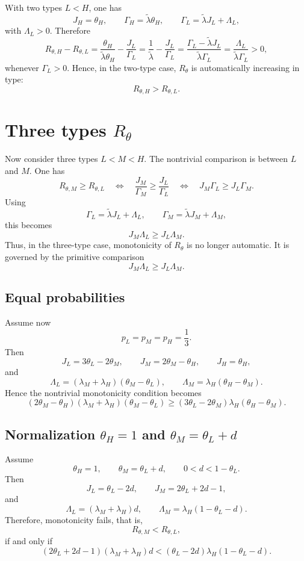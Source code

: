 \documentclass[11pt]{article}
\begin{document}
With two types $L<H$, one has
\[
J_H=\theta_H,
\qquad
\Gamma_H=\tilde\lambda\theta_H,
\qquad
\Gamma_L=\tilde\lambda J_L+\Lambda_L,
\]
with $\Lambda_L>0$. Therefore
\[
R_{\theta,H}-R_{\theta,L}
=
\frac{\theta_H}{\tilde\lambda\theta_H}-\frac{J_L}{\Gamma_L}
=
\frac{1}{\tilde\lambda}-\frac{J_L}{\Gamma_L}
=
\frac{\Gamma_L-\tilde\lambda J_L}{\tilde\lambda\Gamma_L}
=
\frac{\Lambda_L}{\tilde\lambda\Gamma_L}>0,
\]
whenever $\Gamma_L>0$.
Hence, in the two-type case, $R_\theta$ is automatically increasing in type:
\[
R_{\theta,H}>R_{\theta,L}.
\]

\section{Three types $R_\theta$}

Now consider three types $L<M<H$. The nontrivial comparison is between $L$ and $M$.
One has
\[
R_{\theta,M}\ge R_{\theta,L}
\quad\Longleftrightarrow\quad
\frac{J_M}{\Gamma_M}\ge \frac{J_L}{\Gamma_L}
\quad\Longleftrightarrow\quad
J_M\Gamma_L\ge J_L\Gamma_M.
\]
Using
\[
\Gamma_L=\tilde\lambda J_L+\Lambda_L,
\qquad
\Gamma_M=\tilde\lambda J_M+\Lambda_M,
\]
this becomes
\[
J_M\Lambda_L\ge J_L\Lambda_M.
\]
Thus, in the three-type case, monotonicity of $R_\theta$ is no longer automatic. It is governed by the primitive comparison
\[
\boxed{J_M\Lambda_L\ge J_L\Lambda_M.}
\]


\subsection{Equal probabilities}

Assume now
\[
p_L=p_M=p_H=\frac13.
\]
Then
\[
J_L=3\theta_L-2\theta_M,
\qquad
J_M=2\theta_M-\theta_H,
\qquad
J_H=\theta_H,
\]
and
\[
\Lambda_L=(\lambda_M+\lambda_H)(\theta_M-\theta_L),
\qquad
\Lambda_M=\lambda_H(\theta_H-\theta_M).
\]
Hence the nontrivial monotonicity condition becomes
\[
\boxed{
(2\theta_M-\theta_H)(\lambda_M+\lambda_H)(\theta_M-\theta_L)
\ge
(3\theta_L-2\theta_M)\lambda_H(\theta_H-\theta_M).
}
\]

\subsection{ Normalization $\theta_H=1$ and $\theta_M=\theta_L+d$}

Assume
\[
\theta_H=1,
\qquad
\theta_M=\theta_L+d,
\qquad
0<d<1-\theta_L.
\]
Then
\[
J_L=\theta_L-2d,
\qquad
J_M=2\theta_L+2d-1,
\]
and
\[
\Lambda_L=(\lambda_M+\lambda_H)d,
\qquad
\Lambda_M=\lambda_H(1-\theta_L-d).
\]
Therefore, monotonicity fails, that is,
\[
R_{\theta,M}<R_{\theta,L},
\]
if and only if
\[
\boxed{
(2\theta_L+2d-1)(\lambda_M+\lambda_H)d
<
(\theta_L-2d)\lambda_H(1-\theta_L-d).
}
\]
\end{document}

